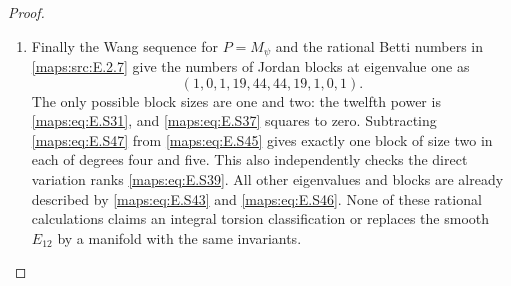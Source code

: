 \begin{proof}
\begin{enumerate}[label=\arabic*.,leftmargin=*]
\item Finally the Wang sequence for $P=M_\psi$ and the rational
Betti numbers in \ref{maps:src:E.2.7} give the numbers of Jordan blocks
at eigenvalue one as
\[
          (1,0,1,19,44,44,19,1,0,1).
 \tag{E.S47}\label{maps:eq:E.S47}
\]
The only possible block sizes are one and two: the
twelfth power is \eqref{maps:eq:E.S31}, and \eqref{maps:eq:E.S37} squares to zero.
Subtracting \eqref{maps:eq:E.S47} from \eqref{maps:eq:E.S45} gives exactly one block
of size two in each of degrees four and five. This also
independently checks the direct variation ranks \eqref{maps:eq:E.S39}.
All other eigenvalues and blocks are already described
by \eqref{maps:eq:E.S43} and \eqref{maps:eq:E.S46}. None of these rational calculations
claims an integral torsion classification or replaces the
smooth $E_{12}$ by a manifold with the same invariants.
\end{enumerate}
\end{proof}

